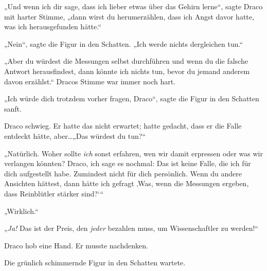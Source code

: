 „Und wenn ich dir sage, dass ich lieber etwas über das Gehirn lerne“, sagte Draco mit harter Stimme, „dann wirst du herumerzählen, dass ich Angst davor hatte, was ich herausgefunden hätte.“

„Nein“, sagte die Figur in den Schatten. „Ich werde nichts dergleichen tun.“

„Aber du würdest die Messungen selbst durchführen und wenn du die falsche Antwort herausfindest, dann könnte ich nichts tun, bevor du jemand anderem davon erzählst.“ Dracos Stimme war immer noch hart.

„Ich würde dich trotzdem vorher fragen, Draco“, sagte die Figur in den Schatten sanft.

Draco schwieg. Er hatte das nicht erwartet; hatte gedacht, dass er die Falle entdeckt hätte, aber…„Das würdest du tun?“

„Natürlich. Woher sollte \emph{ich} sonst erfahren, wen wir damit erpressen oder was wir verlangen könnten? Draco, ich sage es nochmal: Das ist keine Falle, die ich für dich aufgestellt habe. Zumindest nicht für dich persönlich. Wenn du andere Ansichten hättest, dann hätte ich gefragt ‚Was, wenn die Messungen ergeben, dass Reinblütler stärker sind?‘“

„Wirklich.“

„\emph{Ja!} Das ist der Preis, den \emph{jeder} bezahlen muss, um Wissenschaftler zu werden!“

Draco hob eine Hand. Er musste nachdenken.

Die grünlich schimmernde Figur in den Schatten wartete.

